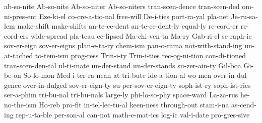 {ab-so-nite
Ab-so-nite
Ab-so-niter
Ab-so-niters
tran-scen-dence
tran-scen-ded
om-ni-pres-ent
Eze-ki-el
co-cre-a-tio-nal
free-will
De-i-ties
port-ra-yal
pla-net
Je-ru-sa-lem
make-shift
make-shifts
an-te-ce-dent
an-te-ce-dent-ly
equal-ly
re-cord-er
re-cord-ers
wide-spread
pla-teau
ec-lipsed
Ma-chi-ven-ta
Ma-ry
Gab-ri-el
se-raph-ic
sov-er-eign
sov-er-eigns
plan-e-ta-ry
chem-ism
pan-o-rama
not-with-stand-ing
un-at-tached
to-tem-ism
prog-ress
Trin-i-ty
Trin-i-ties
rec-og-ni-tion
con-di-tioned
tran-scen-den-tal
ul-ti-mate
un-der-stand
un-der-stands
su-zer-ain-ty
Gil-boa
Gi-be-on
So-lo-mon
Med-i-ter-ra-nean
at-tri-bute
ide-a-tion-al
wo-men
over-in-dul-gence
over-in-dulged
sov-er-eign-ty
su-per-sov-er-eign-ty
soph-ist-ry
soph-ist-ries
ser-a-phim
tri-bu-nal
tri-bu-nals
large-ly
phi-lo-so-phy
space-ward
La-za-rus
he-no-the-ism
Ho-reb
pro-fit
in-tel-lec-tu-al
keen-ness
through-out
stam-i-na
as-cend-ing
rep-u-ta-ble
per-son-al
can-not
math-e-mat-ics
log-ic
val-i-date
pro-gres-sive
}
